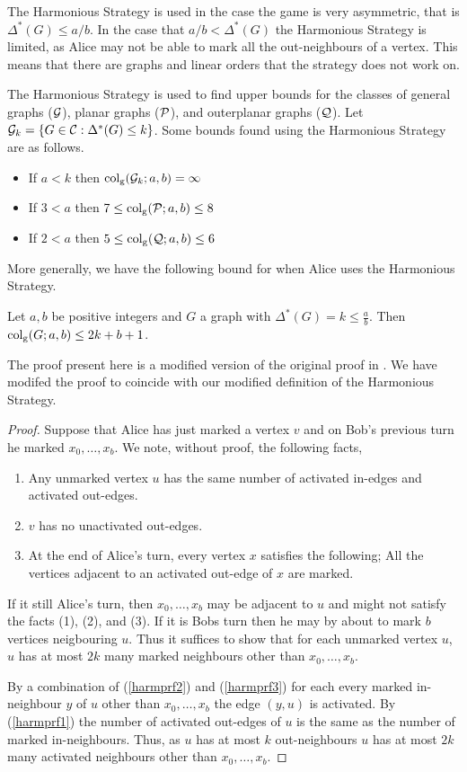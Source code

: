 The Harmonious Strategy is used in the case the game is very asymmetric, that is $\Delta^*(G)\leq a/b$. In the case that $a/b < \Delta^*(G)$ the Harmonious Strategy is limited, as Alice may not be able to mark all the out-neighbours of a vertex. This means that there are graphs and linear orders that the strategy does not work on.

The Harmonious Strategy is used to find upper bounds for the classes of general graphs ($ \mathcal{G} $), planar graphs ($\mathcal{P}$), and outerplanar graphs ($ \mathcal{Q} $). Let $\mathcal{G}_k= \{G\in\mathcal{C}: \Delta^*(G)\leq k\}$. Some bounds found using the Harmonious Strategy are as follows.    
\begin{itemize}
    \item If $a < k$ then $\operatorname{col_g}(\mathcal{G}_k;a,b)=\infty$
    \item If $3<a $ then $7\leq \operatorname{col_g}(\mathcal{P};a,b)\leq 8$
    \item If $2< a$ then $5\leq \operatorname{col_g}(\mathcal{Q};a,b)\leq 6$
\end{itemize}
More generally, we have the following bound for when Alice uses the Harmonious Strategy.
\begin{theorem}
    Let $a,b$ be positive integers and $G$ a graph with $\Delta^*(G)=k\leq\frac{a}{b}$. Then $\operatorname{col_g}(G;a,b)\leq 2k+b+1$.
\end{theorem}

The proof present here is a modified version of the original proof in \cite{kierYang2005}. We have modifed the proof to coincide with our modified definition of the  Harmonious Strategy.

\begin{proof}Suppose that Alice has just marked a vertex $v$ and on Bob's previous turn he marked $x_0,\dots,x_b$.
    We note, without proof, the following facts, 
    \begin{enumerate}[(1)]
        \item Any unmarked vertex $u$ has the same number of activated in-edges and activated out-edges. \label{harmprf1} 
        \item $v$ has no unactivated out-edges. \label{harmprf2}
        \item At the end of Alice's turn, every vertex $x$ satisfies the following; All the vertices adjacent to an activated out-edge of $x$ are marked. \label{harmprf3}
    \end{enumerate}
If it still Alice's turn, then $x_0,\dots,x_b$ may be adjacent to $u$ and might not satisfy the facts (1), (2), and (3). If it is Bobs turn then he may by about to mark $b$ vertices neigbouring $u$. Thus it suffices to show that for each unmarked vertex $u$, $u$ has at most $2k$ many marked neighbours other than $x_0,\dots,x_b$.

By a combination of (\ref{harmprf2}) and (\ref{harmprf3}) for each every marked in-neighbour $y$  of $u$ other than $x_0,\dots,x_b$ the edge $(y,u)$ is activated. By (\ref{harmprf1}) the number of activated out-edges of $u$ is the same as the number of marked in-neighbours. Thus, as $u$ has at most $k$ out-neighbours $u$ has at most $2k$ many activated neighbours other than $x_0,\dots,x_b$.
\end{proof}

